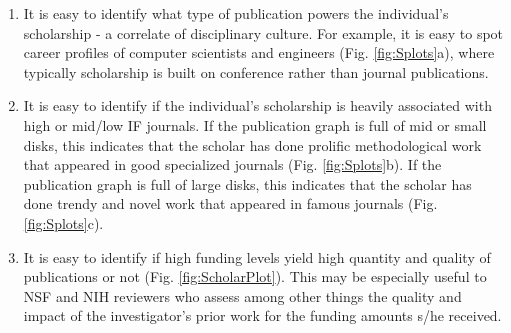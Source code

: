 \begin{enumerate}
\item It is easy to identify what type of publication powers the individual's scholarship - a correlate of disciplinary culture. For example, it is easy to spot career profiles of computer scientists and engineers (Fig. \ref{fig:Splots}a), where typically scholarship is built on conference rather than journal publications.
\item It is easy to identify if the individual's scholarship is heavily associated with high or mid/low IF journals. If the publication graph is full of mid or small disks, this indicates that the scholar has done prolific methodological work that appeared in good specialized journals (Fig. \ref{fig:Splots}b). If the publication graph is full of large disks, this indicates that the scholar has done trendy and novel work that appeared in famous journals (Fig. \ref{fig:Splots}c).
\item It is easy to identify if high funding levels yield high quantity and quality of publications or not (Fig. \ref{fig:ScholarPlot}). This may be especially useful to NSF and NIH reviewers who assess among other things the quality and impact of the investigator's prior work for the funding amounts s/he received.
\begin{figure}
    \centering
     \\
\end{figure}
\end{enumerate}
